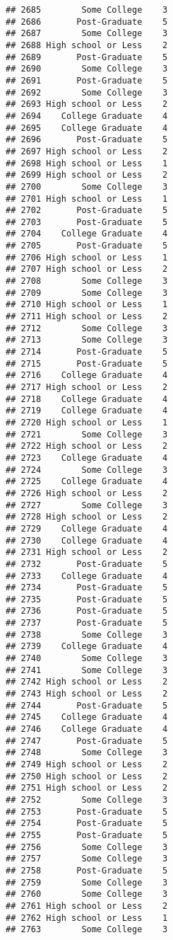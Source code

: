 \documentclass[
]{article}
\begin{document}
\begin{verbatim}
## 2685        Some College    3
## 2686       Post-Graduate    5
## 2687        Some College    3
## 2688 High school or Less    2
## 2689       Post-Graduate    5
## 2690        Some College    3
## 2691       Post-Graduate    5
## 2692        Some College    3
## 2693 High school or Less    2
## 2694    College Graduate    4
## 2695    College Graduate    4
## 2696       Post-Graduate    5
## 2697 High school or Less    2
## 2698 High school or Less    1
## 2699 High school or Less    2
## 2700        Some College    3
## 2701 High school or Less    1
## 2702       Post-Graduate    5
## 2703       Post-Graduate    5
## 2704    College Graduate    4
## 2705       Post-Graduate    5
## 2706 High school or Less    1
## 2707 High school or Less    2
## 2708        Some College    3
## 2709        Some College    3
## 2710 High school or Less    1
## 2711 High school or Less    2
## 2712        Some College    3
## 2713        Some College    3
## 2714       Post-Graduate    5
## 2715       Post-Graduate    5
## 2716    College Graduate    4
## 2717 High school or Less    2
## 2718    College Graduate    4
## 2719    College Graduate    4
## 2720 High school or Less    1
## 2721        Some College    3
## 2722 High school or Less    2
## 2723    College Graduate    4
## 2724        Some College    3
## 2725    College Graduate    4
## 2726 High school or Less    2
## 2727        Some College    3
## 2728 High school or Less    2
## 2729    College Graduate    4
## 2730    College Graduate    4
## 2731 High school or Less    2
## 2732       Post-Graduate    5
## 2733    College Graduate    4
## 2734       Post-Graduate    5
## 2735       Post-Graduate    5
## 2736       Post-Graduate    5
## 2737       Post-Graduate    5
## 2738        Some College    3
## 2739    College Graduate    4
## 2740        Some College    3
## 2741        Some College    3
## 2742 High school or Less    2
## 2743 High school or Less    2
## 2744       Post-Graduate    5
## 2745    College Graduate    4
## 2746    College Graduate    4
## 2747       Post-Graduate    5
## 2748        Some College    3
## 2749 High school or Less    2
## 2750 High school or Less    2
## 2751 High school or Less    2
## 2752        Some College    3
## 2753       Post-Graduate    5
## 2754       Post-Graduate    5
## 2755       Post-Graduate    5
## 2756        Some College    3
## 2757        Some College    3
## 2758       Post-Graduate    5
## 2759        Some College    3
## 2760        Some College    3
## 2761 High school or Less    2
## 2762 High school or Less    1
## 2763        Some College    3

\end{verbatim}
\end{document}
